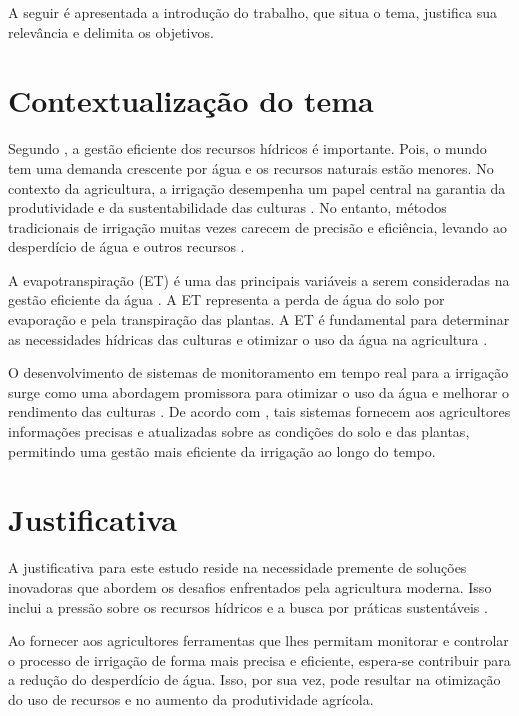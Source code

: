 A seguir é apresentada a introdução do trabalho, que situa o tema, justifica sua relevância e delimita os objetivos.

\section{Contextualização do tema}
Segundo \textcite{carmody_fao2023}, a gestão eficiente dos recursos hídricos é importante. Pois, o mundo tem uma demanda crescente por água e os recursos naturais estão menores. No contexto da agricultura, a irrigação desempenha um papel central na garantia da produtividade e da sustentabilidade das culturas \parencite{Ramos_irrigacao2022}. No entanto, métodos tradicionais de irrigação muitas vezes carecem de precisão e eficiência, levando ao desperdício de água e outros recursos \parencite{Pereira_irrigation2002}.

A evapotranspiração (ET) é uma das principais variáveis a serem consideradas na gestão eficiente da água \parencite{yang_nature2023}. A ET representa a perda de água do solo por evaporação e pela transpiração das plantas. A ET é fundamental para determinar as necessidades hídricas das culturas e otimizar o uso da água na agricultura \parencite{carmody_fao2023, yang_nature2023}.

O desenvolvimento de sistemas de monitoramento em tempo real para a irrigação surge como uma abordagem promissora para otimizar o uso da água e melhorar o rendimento das culturas \parencite{Vijh_system2024, Dutta_system2024, Amine_system2024}. De acordo com \textcite{Prathibha_system2017}, tais sistemas fornecem aos agricultores informações precisas e atualizadas sobre as condições do solo e das plantas, permitindo uma gestão mais eficiente da irrigação ao longo do tempo.

\section{Justificativa}
A justificativa para este estudo reside na necessidade premente de soluções inovadoras que abordem os desafios enfrentados pela agricultura moderna. Isso inclui a pressão sobre os recursos hídricos e a busca por práticas sustentáveis \parencite{carmody_fao2023}. 

Ao fornecer aos agricultores ferramentas que lhes permitam monitorar e
controlar o processo de irrigação de forma mais precisa e eficiente, espera-se contribuir para a redução do desperdício de água. Isso, por sua vez, pode resultar na otimização do uso de recursos e no aumento da produtividade agrícola.

